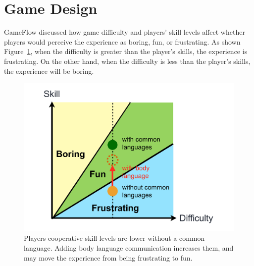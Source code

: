 \section{Game Design}



GameFlow\cite{GD1} discussed how game difficulty and players' skill levels affect whether players would perceive the experience as boring, fun, or frustrating. As shown Figure~\ref{fig:GD_F1}, when the difficulty is greater than the player's skills, the experience is frustrating. On the other hand, when the difficulty is less than the player's skills, the experience will be boring.


\begin{figure}[!b]
\centering
\includegraphics[width=0.9\columnwidth]{Figures/GD_F1.pdf}
\caption{Players cooperative skill levels are lower without a common language. Adding body language communication increases them, and may move the experience from being frustrating to fun.}
\label{fig:GD_F1}
\end{figure}


